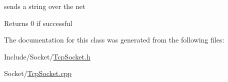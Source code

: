 sends a string over the net 

\begin{DoxyReturn}{\-Returns}
0 if successful 
\end{DoxyReturn}


\-The documentation for this class was generated from the following files\-:\begin{DoxyCompactItemize}
\item 
\-Include/\-Socket/\hyperlink{_tcp_socket_8h}{\-Tcp\-Socket.\-h}\item 
\-Socket/\hyperlink{_tcp_socket_8cpp}{\-Tcp\-Socket.\-cpp}\end{DoxyCompactItemize}

